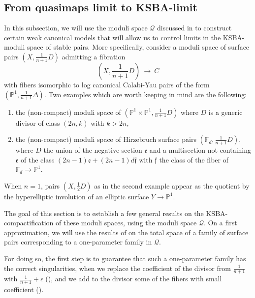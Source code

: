 \documentclass[a4paper,12pt]{amsart}
\newcommand{\mtf}[1]{\mathfrak{#1}}
\newcommand{\cQ}{\mathcal{Q}}
\newcommand{\bF}{\mathbb{F}}
\newcommand{\bP}{{\mathbb P}}
\theoremstyle{definition}
\theoremstyle{remark}
\begin{document}
\subsection{From quasimaps limit to KSBA-limit}\label{sec:KSBA limit}

In this subsection, we will use the moduli space $\cQ$ discussed in  to construct certain weak canonical models that will allow us to control limits in the KSBA-moduli space of stable pairs. More specifically, consider a moduli space of surface pairs $(X,\frac{1}{n+1}D)$ admitting a fibration $$\textstyle (X,\frac{1}{n+1}D)\ \longrightarrow \  C$$ with fibers isomorphic to log canonical Calabi-Yau pairs of the form $(\bP^1,\frac{1}{n+1}\Delta)$.
Two examples which are worth keeping in mind are the following:
\begin{enumerate}
    \item the (non-compact) moduli space of $(\bP^1\times\bP^1,\frac{1}{n+1}D)$ where $D$ is a generic divisor of class $(2n,k)$ with $k> 2n$,
    \item the (non-compact) moduli space of Hirzebruch surface pairs $(\bF_d,\frac{1}{n+1}D)$, where $D$ the union of the negative section $\mtf{e}$ and a multisection not containing $\mtf{e}$ of the class $(2n-1)\mtf{e}+(2n-1)d\mtf{f}$ with $\mtf{f}$ the class of the fiber of $\bF_d\rightarrow \bP^1$. 
\end{enumerate}
When $n=1$, pairs $(X,\frac{1}{2}D)$ as in the second example appear as the quotient by the hyperelliptic involution of an elliptic surface $Y\to \bP^1$.

 The goal of this section is to establish a few general results on the KSBA-compactification of these moduli spaces, using the moduli space $\cQ$. On a first approximation, we will use the results of  on the total space of a family of surface pairs corresponding to a one-parameter family in $\cQ$.
 
 For doing so, the first step is to guarantee that such a one-parameter family has the correct singularities, when we replace the coefficient of the divisor from $\frac{1}{n+1}$ with $\frac{1}{n+1} +\epsilon$ (), and we add to the divisor some of the fibers with small coefficient (). 
\end{document}
